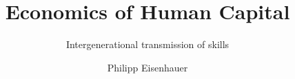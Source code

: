 

\title{Economics of Human Capital}
\subtitle{\vspace{0.3cm}Intergenerational transmission of skills}
\author{Philipp Eisenhauer}

\date{}

\let\otp\titlepage
